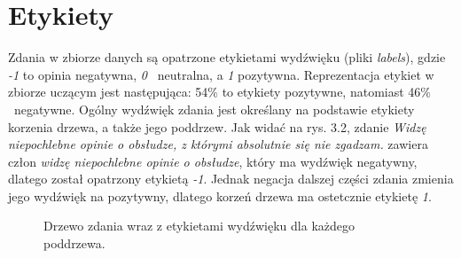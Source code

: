 \section{Etykiety}
Zdania w zbiorze danych są opatrzone etykietami wydźwięku (pliki \textit{labels}), gdzie \textit{-1} to opinia negatywna, \textit{0} \textendash \ neutralna, a \textit{1} pozytywna. Reprezentacja etykiet w zbiorze uczącym jest następująca: 54\% to etykiety pozytywne, natomiast 46\% \textendash \ negatywne. Ogólny wydźwięk zdania jest określany na podstawie etykiety korzenia drzewa, a także jego poddrzew. Jak widać na rys. 3.2, zdanie \textit{Widzę niepochlebne opinie o obsłudze, z którymi absolutnie się nie zgadzam.} zawiera człon \textit{widzę niepochlebne opinie o obsłudze}, który ma wydźwięk negatywny, dlatego został opatrzony etykietą \textit{-1}. Jednak negacja dalszej części zdania zmienia jego wydźwięk na pozytywny, dlatego korzeń drzewa ma ostetcznie etykietę \textit{1}. 
\label{sec:etykiety}
\begin{figure}[H]
    \centering
    \caption{Drzewo zdania wraz z etykietami wydźwięku dla każdego poddrzewa.}
\end{figure}



